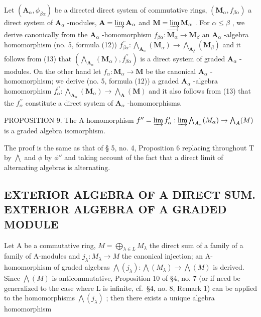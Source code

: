 Let \((\mathbf{A}_{\alpha},\phi_{\beta \alpha})\) be a directed direct system of commutative rings, \((\mathbf{M}_{\alpha},f_{\beta \alpha})\) a direct system of \(\mathbf{A}_{\alpha}\) -modules, \(\mathbf{A} = \varinjlim \mathbf{A}_{\alpha}\) and \(\mathbf{M} = \varinjlim \mathbf{M}_{\alpha}\) . For \(\alpha \leqslant \beta\) , we derive canonically from the \(\mathbf{A}_{\alpha}\) -homomorphism \(f_{\beta \alpha}: \overrightarrow{\mathbf{M}_{\alpha}} \to \mathbf{M}_{\beta}\) an \(\mathbf{A}_{\alpha}\) -algebra homomorphism (no. 5, formula (12)) \(f_{\beta \alpha}^{\prime \prime}: \bigwedge_{\mathbf{A}_{\alpha}} (\mathbf{M}_{\alpha}) \to \bigwedge_{\mathbf{A}_{\beta}} (\mathbf{M}_{\beta})\) and it follows from (13) that \((\bigwedge_{\mathbf{A}_{\alpha}} (\mathbf{M}_{\alpha}), f_{\beta \alpha}^{\prime \prime})\) is a direct system of graded \(\mathbf{A}_{\alpha}\) -modules. On the other hand let \(f_{\alpha}: \mathbf{M}_{\alpha} \to \mathbf{M}\) be the canonical \(\mathbf{A}_{\alpha}\) -homomorphism; we derive (no. 5, formula (12)) a graded \(\mathbf{A}_{\alpha}\) -algebra homomorphism \(f_{\alpha}^{\prime \prime}: \bigwedge_{\mathbf{A}_{\alpha}} (\mathbf{M}_{\alpha}) \to \bigwedge_{\mathbf{A}} (\mathbf{M})\) and it also follows from (13) that the \(f_{\alpha}^{\prime \prime}\) constitute a direct system of \(\mathbf{A}_{\alpha}\) -homomorphisms.

PROPOSITION 9. The A-homomorphism \(f'' = \varinjlim f_{\alpha}' : \varinjlim \bigwedge_{A_{\alpha}}(M_{\alpha}) \to \bigwedge_{A}(M)\) is a graded algebra isomorphism.

The proof is the same as that of § 5, no. 4, Proposition 6 replacing throughout T by \(\bigwedge\) and \(\phi\) by \(\phi''\) and taking account of the fact that a direct limit of alternating algebras is alternating.

\subsection{EXTERIOR ALGEBRA OF A DIRECT SUM. EXTERIOR ALGEBRA OF A GRADED MODULE}

Let A be a commutative ring, \(M = \bigoplus_{\lambda \in L} M_{\lambda}\) the direct sum of a family of a family of A-modules and \(j_{\lambda}: M_{\lambda} \to M\) the canonical injection; an A-homomorphism of graded algebras \(\bigwedge(j_{\lambda}): \bigwedge(M_{\lambda}) \to \bigwedge(M)\) is derived. Since \(\bigwedge(M)\) is anticommutative, Proposition 10 of §4, no. 7 (or if need be generalized to the case where L is infinite, cf.~§4, no. 8, Remark 1) can be applied to the homomorphisms \(\bigwedge(j_{\lambda})\) ; then there exists a unique algebra homomorphism

